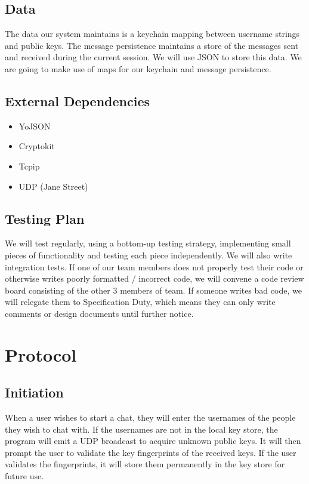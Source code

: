 \documentclass{scrartcl}
\begin{document}
\subsection{Data}
The data our system maintains is a keychain mapping between username strings and public keys. The message persistence maintains a store of the messages sent and received during the current session. We will use JSON to store this data. We are going to make use of maps for our keychain and message persistence. 

\subsection{External Dependencies}
\begin{itemize}
	\item YoJSON
	\item Cryptokit
	\item Tcpip
	\item UDP (Jane Street)
\end{itemize}

\subsection{Testing Plan}
We will test regularly, using a bottom-up testing strategy, implementing small pieces of functionality and testing each piece independently. We will also write integration tests. If one of our team members does not properly test their code or otherwise writes poorly formatted / incorrect code, we will convene a code review board consisting of the other 3 members of team. If someone writes bad code, we will relegate them to Specification Duty, which means they can only write comments or design documents until further notice.

\section{Protocol}
\subsection{Initiation}
When a user wishes to start a chat, they will enter the usernames of the people they wish to chat with. If the usernames are not in the local key store, the program will emit a UDP broadcast to acquire unknown public keys. It will then prompt the user to validate the key fingerprints of the received keys. If the user validates the fingerprints, it will store them permanently in the key store for future use.
\end{document}
